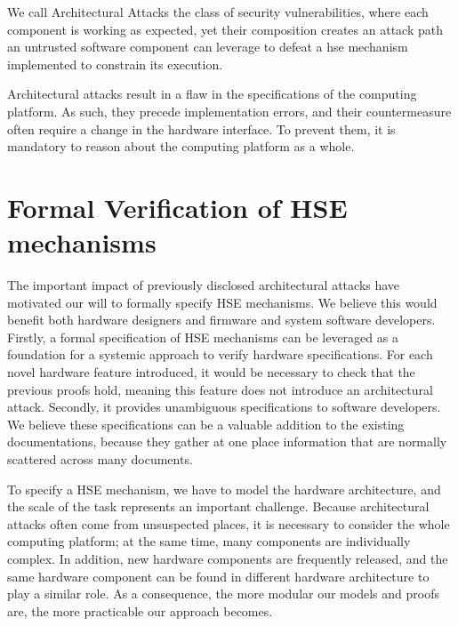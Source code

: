 \begin{definition}
  We call Architectural Attacks the class of security vulnerabilities, where
  each component is working as expected, yet their composition creates an attack
  path an untrusted software component can leverage to defeat a \ac{hse}
  mechanism implemented to constrain its execution.
\end{definition}

Architectural attacks result in a flaw in the specifications of the computing
platform.
%
As such, they precede implementation errors, and their countermeasure often
require a change in the hardware interface.
%
To prevent them, it is mandatory to reason about the computing platform as a
whole.

\section{Formal Verification of HSE mechanisms}

The important impact of previously disclosed architectural attacks have
motivated our will to formally specify HSE mechanisms.
%
We believe this would benefit both hardware designers and firmware and system
software developers.
%
Firstly, a formal specification of HSE mechanisms can be leveraged as a
foundation for a systemic approach to verify hardware specifications.
%
For each novel hardware feature introduced, it would be necessary to check that
the previous proofs hold, meaning this feature does not introduce an
architectural attack.
%
Secondly, it provides unambiguous specifications to software developers.
%
We believe these specifications can be a valuable addition to the existing
documentations, because they gather at one place information that are normally
scattered across many documents.

To specify a HSE mechanism, we have to model the hardware architecture, and the
scale of the task represents an important challenge.
%
Because architectural attacks often come from unsuspected places, it is
necessary to consider the whole computing platform; at the same time, many
components are individually complex.
%
In addition, new hardware components are frequently released, and the same
hardware component can be found in different hardware architecture to play a
similar role.
%
As a consequence, the more modular our models and proofs are, the more
practicable our approach becomes.

